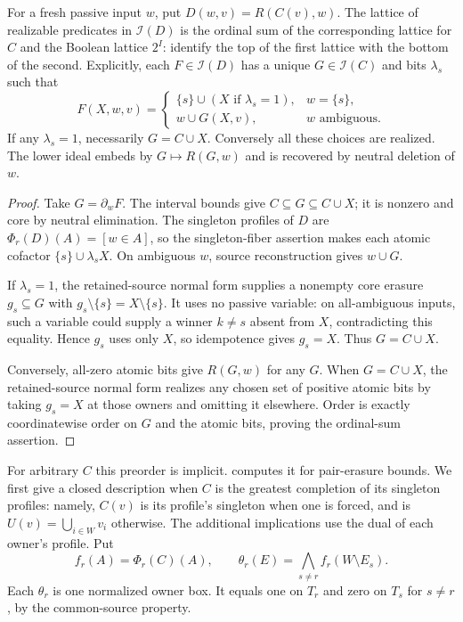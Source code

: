 \begin{proposition}
\label{core:prop:reset-interval-lattice}
For a fresh passive input $w$, put $D(w,v)=R(C(v),w)$.
The lattice of realizable predicates in $\mathcal I(D)$ is the ordinal
sum of the corresponding lattice for $C$ and the Boolean lattice $2^I$:
identify the top of the first lattice with the bottom of the second.
Explicitly, each $F\in\mathcal I(D)$ has a unique
$G\in\mathcal I(C)$ and bits $\lambda_s$ such that
\[
 F(X,w,v)=
 \begin{cases}
 \{s\}\cup( X\text{ if }\lambda_s=1),&w=\{s\},\\
 w\cup G(X,v),&w\text{ ambiguous}.
 \end{cases}
\]
If any $\lambda_s=1$, necessarily $G=C\cup X$.
Conversely all these choices are realized. The lower ideal embeds by
$G\mapsto R(G,w)$ and is recovered by neutral deletion of $w$.
\end{proposition}
\begin{proof}
Take $G=\partial_wF$. The interval bounds give
$C\subseteq G\subseteq C\cup X$; it is nonzero and core by neutral
elimination. The singleton profiles of $D$ are
$\Phi_r(D)(A)=[w\in A]$, so the
singleton-fiber assertion makes each atomic cofactor
$\{s\}\cup\lambda_s X$. On ambiguous $w$, source reconstruction
gives $w\cup G$.

If $\lambda_s=1$, the retained-source normal form supplies a nonempty
core erasure $g_s\subseteq G$ with
$g_s\setminus\{s\}=X\setminus\{s\}$.
It uses no passive variable: on all-ambiguous inputs, such a variable
could supply a winner $k\ne s$ absent from $X$, contradicting this
equality. Hence $g_s$ uses only $X$, so idempotence gives $g_s=X$.
Thus $G=C\cup X$.

Conversely, all-zero atomic bits give $R(G,w)$ for any $G$.
When $G=C\cup X$, the retained-source normal form realizes any
chosen set of positive atomic bits by taking $g_s=X$ at those owners
and omitting it elsewhere. Order is exactly coordinatewise order on
$G$ and the atomic bits, proving the ordinal-sum assertion.
\end{proof}

For arbitrary $C$ this preorder is implicit.
 computes it for pair-erasure bounds.
We first give a closed description when $C$ is the greatest completion
of its singleton profiles: namely,
$C(v)$ is its profile's singleton when one is forced, and is
$U(v)=\bigcup_{i\in W}v_i$ otherwise. The additional implications use
the dual of each owner's profile. Put
\[
 f_r(A)=\Phi_r(C)(A),\qquad
 \theta_r(E)=\bigwedge_{s\ne r} f_r(W\setminus E_s).
\]
Each $\theta_r$ is one normalized owner box. It equals one on $T_r$
and zero on $T_s$ for $s\ne r$, by the common-source property.

